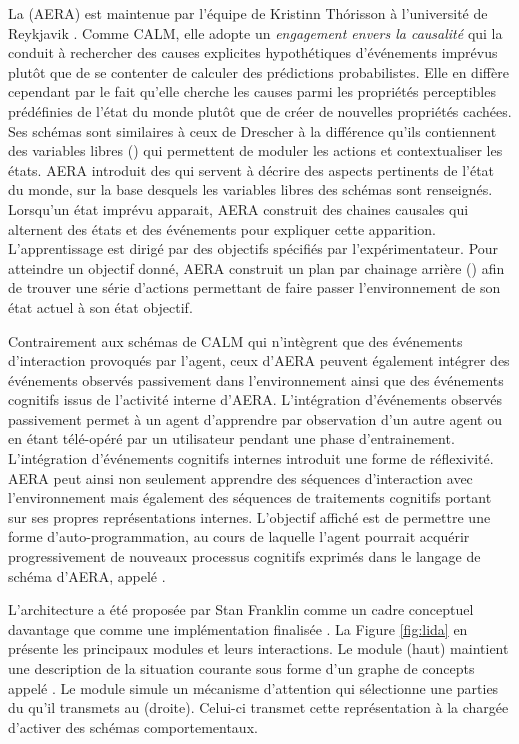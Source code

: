 La  (AERA) est maintenue par l'équipe de Kristinn Thórisson à l'université de Reykjavik \cite{thorisson_self-programming_2012}. 
Comme CALM, elle adopte un \emph{engagement envers la causalité} qui la conduit à rechercher des causes explicites hypothétiques d'événements imprévus plutôt que de se contenter de calculer des prédictions probabilistes.
Elle en diffère cependant par le fait qu'elle cherche les causes parmi les propriétés perceptibles prédéfinies de l'état du monde plutôt que de créer de nouvelles propriétés cachées.
Ses schémas sont similaires à ceux de Drescher à la différence qu'ils contiennent des variables libres () qui permettent de moduler les actions et contextualiser les états. 
AERA introduit des  qui servent à décrire des aspects pertinents de l'état du monde, sur la base desquels les variables libres des schémas sont renseignés.
Lorsqu'un état imprévu apparait, AERA construit des chaines causales qui alternent des états et des événements pour expliquer cette apparition. 
L'apprentissage est dirigé par des objectifs spécifiés par l'expérimentateur.
Pour atteindre un objectif donné, AERA construit un plan par chainage arrière () afin de trouver une série d'actions permettant de faire passer l'environnement de son état actuel à son état objectif.

Contrairement aux schémas de CALM qui n'intègrent que des événements d'interaction provoqués par l'agent, ceux d'AERA peuvent également intégrer des événements observés passivement dans l'environnement ainsi que des événements cognitifs issus de l'activité interne d'AERA. 
L'intégration d'événements observés passivement permet à un agent d'apprendre par observation d'un autre agent ou en étant télé-opéré par un utilisateur pendant une phase d'entrainement. 
L'intégration d'événements cognitifs internes introduit une forme de réflexivité. 
AERA peut ainsi non seulement apprendre des séquences d'interaction avec l'environnement mais également des séquences de traitements cognitifs portant sur ses propres représentations internes.
L'objectif affiché est de permettre une forme d’auto-programmation, au cours de laquelle l’agent pourrait acquérir progressivement de nouveaux processus cognitifs exprimés dans le langage de schéma d'AERA, appelé .



L'architecture  a été proposée par Stan Franklin comme un cadre conceptuel davantage que comme une implémentation finalisée \cite{franklin_lida_2014}. 
La Figure \ref{fig:lida} en présente les principaux modules et leurs interactions. 
Le module  (haut) maintient une description de la situation courante sous forme d'un graphe de concepts appelé .
Le module  simule un mécanisme d'attention qui sélectionne une parties du  qu'il transmets au  (droite).
Celui-ci transmet cette représentation à la  chargée d'activer des schémas comportementaux.

